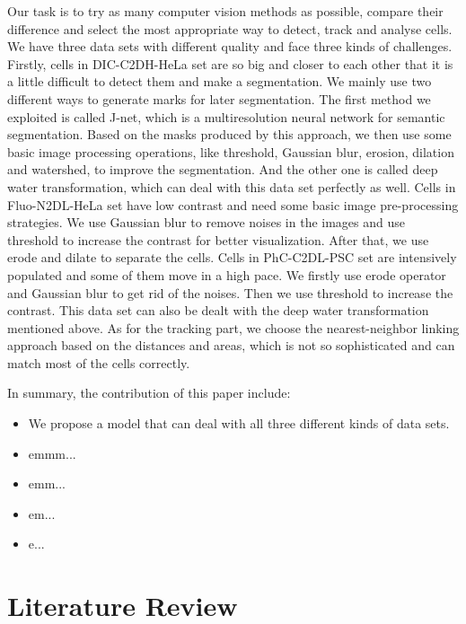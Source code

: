 \documentclass[conference]{IEEEtran}
\begin{document}
Our task is to try as many computer vision methods as possible, compare their difference and select the most appropriate way to detect, track and analyse cells. We have three data sets with different quality and face three kinds of challenges. 
Firstly, cells in DIC-C2DH-HeLa set are so big and closer to each other that it is a little difficult to detect them and make a segmentation. We mainly use two different ways to generate marks for later segmentation. The first method we exploited is called J-net, which is a multiresolution neural network for semantic segmentation. Based on the masks produced by this approach, we then use some basic image processing operations, like threshold, Gaussian blur, erosion, dilation and watershed, to improve the segmentation. And the other one is called deep water transformation, which can deal with this data set perfectly as well.
Cells in Fluo-N2DL-HeLa set have low contrast and need some basic image pre-processing strategies. We use Gaussian blur to remove noises in the images and use threshold to increase the contrast for better visualization. After that, we use erode and dilate to separate the cells.
Cells in PhC-C2DL-PSC set are intensively populated and some of them move in a high pace. We firstly use erode operator and Gaussian blur to get rid of the noises. Then we use threshold to increase the contrast. This data set can also be dealt with the deep water transformation mentioned above.
As for the tracking part, we choose the nearest-neighbor linking approach based on the distances and areas, which is not so sophisticated and can match most of the cells correctly.\par
In summary, the contribution of this paper include:
\begin{itemize}
\item We propose a model that can deal with all three different kinds of data sets.
\item emmm...
\item emm...
\item em...
\item e...
\end{itemize}


\section{Literature Review}
\end{document}
